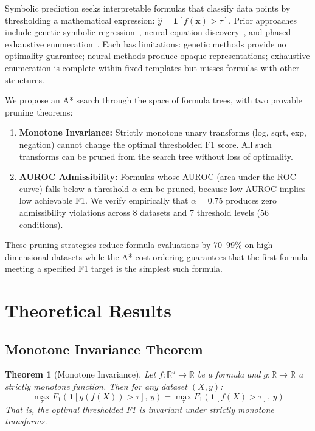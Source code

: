 \documentclass[journal]{IEEEtran}
\newtheorem{theorem}{Theorem}
\begin{document}
Symbolic prediction seeks interpretable formulas that classify data
points by thresholding a mathematical expression: $\hat{y} =
\mathbf{1}[f(\mathbf{x}) > \tau]$. Prior approaches include genetic
symbolic regression~\cite{schmidt2009distilling,cranmer2023interpretable},
neural equation discovery~\cite{udrescu2020ai}, and phased exhaustive
enumeration~\cite{bond2026phased}. Each has limitations: genetic
methods provide no optimality guarantee; neural methods produce
opaque representations; exhaustive enumeration is complete within
fixed templates but misses formulas with other structures.

We propose an A* search through the space of formula trees, with
two provable pruning theorems:

\begin{enumerate}
\item \textbf{Monotone Invariance:} Strictly monotone unary
transforms (log, sqrt, exp, negation) cannot change the optimal
thresholded F1 score. All such transforms can be pruned from
the search tree without loss of optimality.
\item \textbf{AUROC Admissibility:} Formulas whose AUROC (area under
the ROC curve) falls below a threshold $\alpha$ can be pruned,
because low AUROC implies low achievable F1. We verify empirically
that $\alpha = 0.75$ produces zero admissibility violations across
8 datasets and 7 threshold levels (56 conditions).
\end{enumerate}

These pruning strategies reduce formula evaluations by 70--99\%
on high-dimensional datasets while the A* cost-ordering guarantees
that the first formula meeting a specified F1 target is the simplest
such formula.

\section{Theoretical Results}

\subsection{Monotone Invariance Theorem}

\begin{theorem}[Monotone Invariance]
\label{thm:monotone}
Let $f: \mathbb{R}^d \to \mathbb{R}$ be a formula and
$g: \mathbb{R} \to \mathbb{R}$ a strictly monotone function.
Then for any dataset $(X, y)$:
\[
\max_\tau F_1\!\left(\mathbf{1}[g(f(X)) > \tau],\, y\right)
= \max_\tau F_1\!\left(\mathbf{1}[f(X) > \tau],\, y\right)
\]
That is, the optimal thresholded F1 is invariant under strictly
monotone transforms.
\end{theorem}
\end{document}
